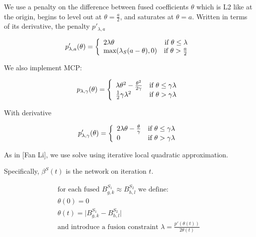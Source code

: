\documentclass[11pt]{article}
\begin{document}
We use a penalty on the difference between fused coefficients $\theta$ which is L2 like at the origin, begins to level out at $\theta = \frac{a}{2}$, and saturates at $\theta = a$. Written in terms of its derivative, the penalty $p'_{\lambda, a}$

\begin{equation}
p'_{\lambda,a}(\theta) = \left\{
    \begin{array}{lr}
    2\lambda\theta & \text{if } \theta \leq \lambda\\
    \text{max}(\lambda_S(a-\theta),0) & \text{if } \theta > {a \over 2}
    \end{array}
    \right.
\end{equation}

We also implement MCP:

\begin{equation}
p_{\lambda,\gamma}(\theta) = \left\{
    \begin{array}{lr}
    \lambda\theta^2-{ \theta^2 \over 2\gamma} & \text{if } \theta \leq \gamma\lambda\\
    {1 \over 2}\gamma\lambda^2 & \text{if } \theta > \gamma\lambda
    \end{array}
    \right. 
\end{equation}

With derivative

\begin{equation}
p'_{\lambda,\gamma}(\theta) = \left\{
    \begin{array}{lr}
    2\lambda\theta - {\theta \over \gamma} & \text{if } \theta \leq \gamma\lambda\\
    0 & \text{if } \theta > \gamma\lambda
    \end{array}
    \right.
\end{equation}
    
As in [Fan Li], we use solve using iterative local quadratic approximation. 

Specifically, $\beta^S(t)$ is the network on iteration $t$. 

\begin{equation}
\begin{array}{l}
\text{for each fused  } B^{S_1}_{g,k} \approx B^{S_2}_{h,l}  \text{ we define: } 
\\
\theta(0)=0
\\
\theta(t) = \vert B^{S_1}_{g,k} - B^{S_2}_{h,l} \vert
\\
\text{and introduce a fusion constraint } \lambda = \frac{p'(\theta(t))}{2\theta(t)} 
\\
\end{array}
\end{equation}
\end{document}

